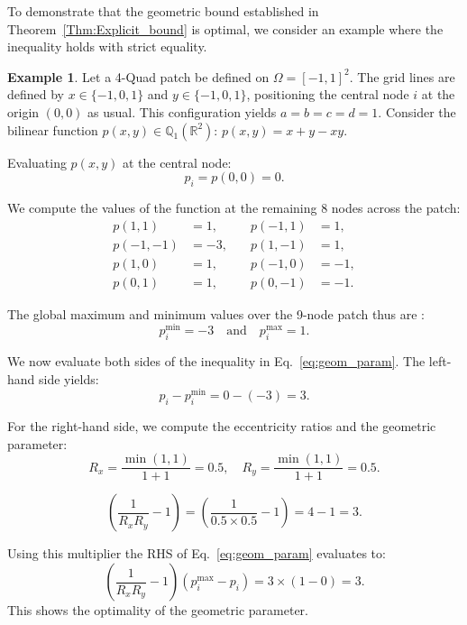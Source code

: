 \documentclass[a4paper]{article}
\theoremstyle{plain}
\theoremstyle{definition}
\newtheorem{example}[lemma]{Example}
\theoremstyle{remark}
\begin{document}
To demonstrate that the geometric bound established in Theorem~\ref{Thm:Explicit_bound} is optimal, we consider an example where the inequality holds with strict equality.

\begin{example}
	Let a 4-Quad patch be defined on $\Omega = [-1,1]^2$. The grid lines are defined by $x \in \{-1, 0, 1\}$ and $y \in \{-1, 0, 1\}$, positioning the central node $i$ at the origin $(0,0)$ as usual. This configuration yields $a = b = c = d = 1$. Consider the bilinear function $p(x,y) \in \mathbb{Q}_1(\mathbb{R}^2)$: $p(x,y) = x + y - xy$.

Evaluating $p(x,y)$ at the central node:
\begin{equation*}
	p_i = p(0,0) = 0.
\end{equation*}

We compute the values of the function at the remaining 8 nodes across the patch:
\begin{align*}
p(1,1) &=  1, \quad &p(-1,1) &=  1, \\
p(-1,-1) &= -3, \quad &p(1,-1) &=  1, \\
p(1,0) &= 1, \quad &p(-1,0) &= -1, \\
p(0,1) &= 1, \quad &p(0,-1) &= -1.
\end{align*}

The global maximum and minimum values over the 9-node patch thus are :
\begin{equation*}
p_i^{\min} = -3 \quad \text{and} \quad p_i^{\max} = 1.
\end{equation*}

We now evaluate both sides of the inequality in Eq.~\eqref{eq:geom_param}. The left-hand side yields:
\begin{equation*}
 p_i - p_i^{\min} = 0 - (-3) = 3.
\end{equation*}

For the right-hand side, we compute the eccentricity ratios and the geometric parameter:
\begin{equation*}
R_x = \frac{\min(1,1)}{1+1} = 0.5, \quad R_y = \frac{\min(1,1)}{1+1} = 0.5.
\end{equation*}

\begin{equation*}
\left( \frac{1}{R_x R_y} - 1 \right) = \left( \frac{1}{0.5 \times 0.5} - 1 \right) = 4 - 1 = 3.
\end{equation*}

Using this multiplier  the RHS of Eq.~\eqref{eq:geom_param} evaluates to:
\begin{equation}
	\left( \frac{1}{R_x R_y} - 1 \right) (p_i^{\max} - p_i) = 3 \times (1 - 0) = 3.
\end{equation}
This shows the optimality of the geometric parameter.

\end{example}
\end{document}
